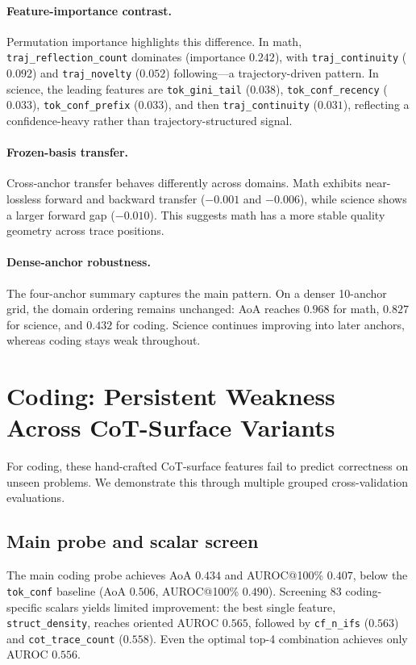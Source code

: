 \documentclass[10pt,twocolumn]{article}
\begin{document}
\paragraph{Feature-importance contrast.}
Permutation importance highlights this difference. In math, \texttt{traj\_reflection\_count} dominates (importance $0.242$), with \texttt{traj\_continuity} ($0.092$) and \texttt{traj\_novelty} ($0.052$) following---a trajectory-driven pattern. In science, the leading features are \texttt{tok\_gini\_tail} ($0.038$), \texttt{tok\_conf\_recency} ($0.033$), \texttt{tok\_conf\_prefix} ($0.033$), and then \texttt{traj\_continuity} ($0.031$), reflecting a confidence-heavy rather than trajectory-structured signal.

\paragraph{Frozen-basis transfer.}
Cross-anchor transfer behaves differently across domains. Math exhibits near-lossless forward and backward transfer ($-0.001$ and $-0.006$), while science shows a larger forward gap ($-0.010$). This suggests math has a more stable quality geometry across trace positions.

\paragraph{Dense-anchor robustness.}
The four-anchor summary captures the main pattern. On a denser 10-anchor grid, the domain ordering remains unchanged: AoA reaches $0.968$ for math, $0.827$ for science, and $0.432$ for coding. Science continues improving into later anchors, whereas coding stays weak throughout.

\section{Coding: Persistent Weakness Across CoT-Surface Variants}
\label{sec:coding}

For coding, these hand-crafted CoT-surface features fail to predict correctness on unseen problems. We demonstrate this through multiple grouped cross-validation evaluations.

\subsection{Main probe and scalar screen}

The main coding probe achieves AoA $0.434$ and AUROC@100\% $0.407$, below the \texttt{tok\_conf} baseline (AoA $0.506$, AUROC@100\% $0.490$). Screening 83 coding-specific scalars yields limited improvement: the best single feature, \texttt{struct\_density}, reaches oriented AUROC $0.565$, followed by \texttt{cf\_n\_ifs} ($0.563$) and \texttt{cot\_trace\_count} ($0.558$). Even the optimal top-4 combination achieves only AUROC $0.556$.
\end{document}
